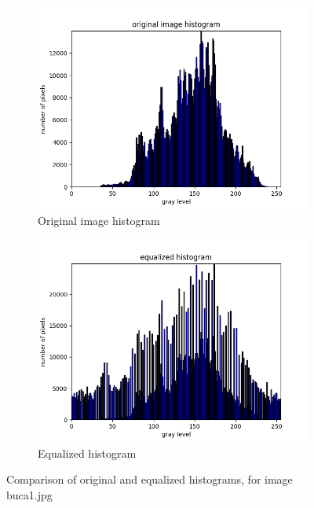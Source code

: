 \documentclass[10pt]{article}
\begin{document}
\begin{figure}[!ht]
  \centering
  \begin{subfigure}[b]{0.4\textwidth}
    \includegraphics[width=\textwidth]{images/flower1-h.png}
    \caption{Original image histogram}
    \label{fig:original-histogram}
  \end{subfigure}
  \begin{subfigure}[b]{0.4\textwidth}
    \includegraphics[width=\textwidth]{images/flower1-e.png}
    \caption{Equalized histogram}
    \label{fig:equalized-histogram}
  \end{subfigure}
  \caption{Comparison of original and equalized histograms, for image buca1.jpg}
\end{figure}
\end{document}

